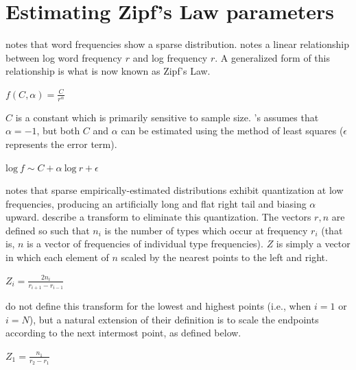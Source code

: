\chapter{Estimating Zipf's Law parameters} \label{zr}

\citet{Zipf1949} notes that word frequencies show a sparse distribution. \citeauthor{Zipf1949} notes a linear relationship between log word frequency $r$ and log frequency $r$. A generalized form of this relationship is what is now known as Zipf's Law.

\begin{unlabeledexample} 
$\displaystyle f(C, \alpha) = \frac{C}{r^\alpha}$ 
\end{unlabeledexample} 

\noindent $C$ is a constant which is primarily sensitive to sample size. \citeauthor{Zipf1949}'s assumes that $\alpha = -1$, but both $C$ and $\alpha$ can be estimated using the method of least squares ($\epsilon$ represents the error term).
 
\begin{unlabeledexample} 
$\displaystyle \textrm{log}~f \sim C + \alpha~\textrm{log}~r + \epsilon$  
\end{unlabeledexample}

\citet{Good1953} notes that sparse empirically-estimated distributions exhibit quantization at low frequencies, producing an artificially long and flat right tail and biasing $\alpha$ upward. \citet[][29]{Church1991} describe a transform to eliminate this quantization. The vectors $r, n$ are defined so such that $n_i$ is the number of types which occur at frequency $r_i$ (that is, $n$ is a vector of frequencies of individual type frequencies). $Z$ is simply a vector in which each element of $n$ scaled by the nearest points to the left and right.

\begin{unlabeledexample}
$\displaystyle Z_i = \frac{2 n_i}{r_{i + 1} - r_{i - 1}}$
\end{unlabeledexample}

\noindent \citeauthor{Church1991} do not define this transform for the lowest and highest points (i.e., when $i = 1$ or $i = N$), but a natural extension of their definition is to scale the endpoints according to the next intermost point, as defined below.

\begin{unlabeledexample}
$\displaystyle Z_1 = \frac{n_1}{r_2 - r_1}$
\end{unlabeledexample}

